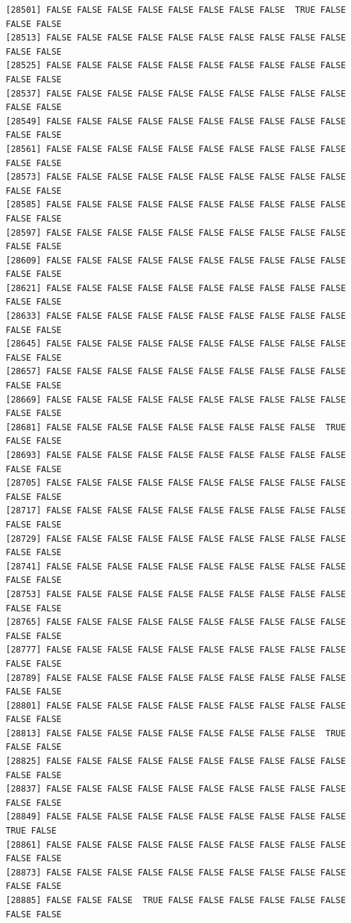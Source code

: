 \documentclass[
  a4paper,
  DIV=11,
  numbers=noendperiod]{scrartcl}
\begin{document}
\begin{verbatim}
[28501] FALSE FALSE FALSE FALSE FALSE FALSE FALSE FALSE  TRUE FALSE FALSE FALSE
[28513] FALSE FALSE FALSE FALSE FALSE FALSE FALSE FALSE FALSE FALSE FALSE FALSE
[28525] FALSE FALSE FALSE FALSE FALSE FALSE FALSE FALSE FALSE FALSE FALSE FALSE
[28537] FALSE FALSE FALSE FALSE FALSE FALSE FALSE FALSE FALSE FALSE FALSE FALSE
[28549] FALSE FALSE FALSE FALSE FALSE FALSE FALSE FALSE FALSE FALSE FALSE FALSE
[28561] FALSE FALSE FALSE FALSE FALSE FALSE FALSE FALSE FALSE FALSE FALSE FALSE
[28573] FALSE FALSE FALSE FALSE FALSE FALSE FALSE FALSE FALSE FALSE FALSE FALSE
[28585] FALSE FALSE FALSE FALSE FALSE FALSE FALSE FALSE FALSE FALSE FALSE FALSE
[28597] FALSE FALSE FALSE FALSE FALSE FALSE FALSE FALSE FALSE FALSE FALSE FALSE
[28609] FALSE FALSE FALSE FALSE FALSE FALSE FALSE FALSE FALSE FALSE FALSE FALSE
[28621] FALSE FALSE FALSE FALSE FALSE FALSE FALSE FALSE FALSE FALSE FALSE FALSE
[28633] FALSE FALSE FALSE FALSE FALSE FALSE FALSE FALSE FALSE FALSE FALSE FALSE
[28645] FALSE FALSE FALSE FALSE FALSE FALSE FALSE FALSE FALSE FALSE FALSE FALSE
[28657] FALSE FALSE FALSE FALSE FALSE FALSE FALSE FALSE FALSE FALSE FALSE FALSE
[28669] FALSE FALSE FALSE FALSE FALSE FALSE FALSE FALSE FALSE FALSE FALSE FALSE
[28681] FALSE FALSE FALSE FALSE FALSE FALSE FALSE FALSE FALSE  TRUE FALSE FALSE
[28693] FALSE FALSE FALSE FALSE FALSE FALSE FALSE FALSE FALSE FALSE FALSE FALSE
[28705] FALSE FALSE FALSE FALSE FALSE FALSE FALSE FALSE FALSE FALSE FALSE FALSE
[28717] FALSE FALSE FALSE FALSE FALSE FALSE FALSE FALSE FALSE FALSE FALSE FALSE
[28729] FALSE FALSE FALSE FALSE FALSE FALSE FALSE FALSE FALSE FALSE FALSE FALSE
[28741] FALSE FALSE FALSE FALSE FALSE FALSE FALSE FALSE FALSE FALSE FALSE FALSE
[28753] FALSE FALSE FALSE FALSE FALSE FALSE FALSE FALSE FALSE FALSE FALSE FALSE
[28765] FALSE FALSE FALSE FALSE FALSE FALSE FALSE FALSE FALSE FALSE FALSE FALSE
[28777] FALSE FALSE FALSE FALSE FALSE FALSE FALSE FALSE FALSE FALSE FALSE FALSE
[28789] FALSE FALSE FALSE FALSE FALSE FALSE FALSE FALSE FALSE FALSE FALSE FALSE
[28801] FALSE FALSE FALSE FALSE FALSE FALSE FALSE FALSE FALSE FALSE FALSE FALSE
[28813] FALSE FALSE FALSE FALSE FALSE FALSE FALSE FALSE FALSE  TRUE FALSE FALSE
[28825] FALSE FALSE FALSE FALSE FALSE FALSE FALSE FALSE FALSE FALSE FALSE FALSE
[28837] FALSE FALSE FALSE FALSE FALSE FALSE FALSE FALSE FALSE FALSE FALSE FALSE
[28849] FALSE FALSE FALSE FALSE FALSE FALSE FALSE FALSE FALSE FALSE  TRUE FALSE
[28861] FALSE FALSE FALSE FALSE FALSE FALSE FALSE FALSE FALSE FALSE FALSE FALSE
[28873] FALSE FALSE FALSE FALSE FALSE FALSE FALSE FALSE FALSE FALSE FALSE FALSE
[28885] FALSE FALSE FALSE  TRUE FALSE FALSE FALSE FALSE FALSE FALSE FALSE FALSE

\end{verbatim}
\end{document}
